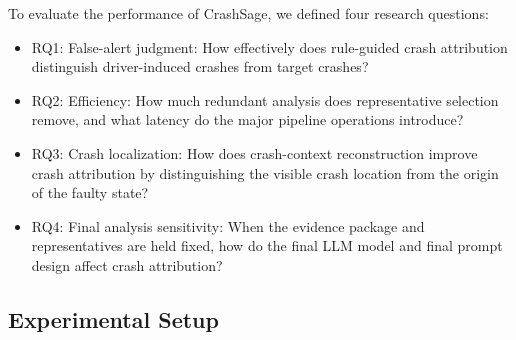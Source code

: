\documentclass[pdflatex,sn-basic]{sn-jnl}%
\theoremstyle{thmstyleone}%
\theoremstyle{thmstyletwo}%
\theoremstyle{thmstylethree}%
\begin{document}
To evaluate the performance of CrashSage, we defined four research questions:

\begin{itemize}
    \item RQ1: False-alert judgment: How effectively does rule-guided crash attribution distinguish driver-induced crashes from target crashes?
    \item RQ2: Efficiency: How much redundant analysis does representative selection remove, and what latency do the major pipeline operations introduce?
    \item RQ3: Crash localization: How does crash-context reconstruction improve crash attribution by distinguishing the visible crash location from the origin of the faulty state?
    \item RQ4: Final analysis sensitivity: When the evidence package and representatives are held fixed, how do the final LLM model and final prompt design affect crash attribution?
\end{itemize}

\subsection{Experimental Setup}
\label{subsec:experimental-setup}
\end{document}
